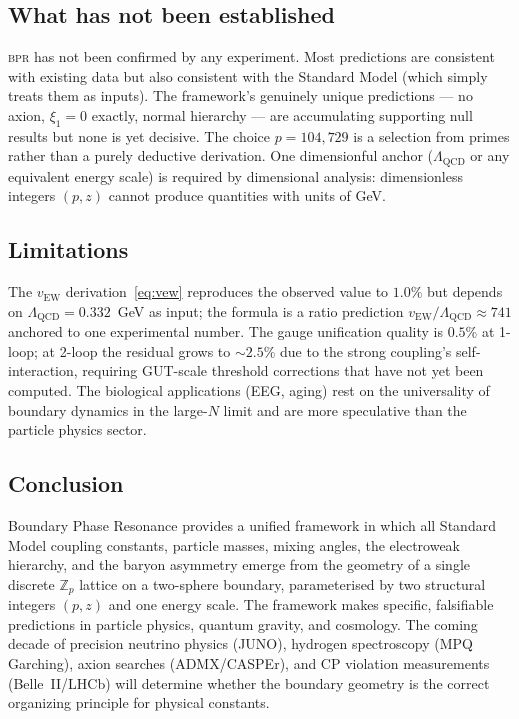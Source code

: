 \documentclass[aps,prd,twocolumn,superscriptaddress,longbibliography,nofootinbib]{revtex4-2}
\newcommand{\Zp}{\mathbb{Z}_p}
\newcommand{\vEW}{v_{\mathrm{EW}}}
\newcommand{\bpr}{\textsc{bpr}}
\begin{document}
\subsection{What has not been established}

\bpr{} has not been confirmed by any experiment.  Most predictions are
consistent with existing data but also consistent with the Standard Model
(which simply treats them as inputs).  The framework's genuinely unique
predictions --- no axion, $\xi_1 = 0$ exactly, normal hierarchy --- are
accumulating supporting null results but none is yet decisive.  The choice
$p = 104{,}729$ is a selection from primes rather than a purely deductive
derivation.  One dimensionful anchor ($\Lambda_{\mathrm{QCD}}$ or any
equivalent energy scale) is required by dimensional analysis: dimensionless
integers $(p, z)$ cannot produce quantities with units of GeV.

\subsection{Limitations}

The $\vEW$ derivation~\eqref{eq:vew} reproduces the observed value to $1.0\%$
but depends on $\Lambda_{\mathrm{QCD}} = 0.332$~GeV as input; the formula is
a ratio prediction $\vEW/\Lambda_{\mathrm{QCD}} \approx 741$ anchored to one
experimental number.  The gauge unification quality is $0.5\%$ at 1-loop;
at 2-loop the residual grows to $\sim2.5\%$ due to the strong coupling's
self-interaction, requiring GUT-scale threshold corrections that have not yet
been computed.  The biological applications (EEG, aging) rest on the
universality of boundary dynamics in the large-$N$ limit and are more
speculative than the particle physics sector.

\subsection{Conclusion}

Boundary Phase Resonance provides a unified framework in which all Standard
Model coupling constants, particle masses, mixing angles, the electroweak
hierarchy, and the baryon asymmetry emerge from the geometry of a single
discrete $\Zp$ lattice on a two-sphere boundary, parameterised by two
structural integers $(p, z)$ and one energy scale.  The framework makes
specific, falsifiable predictions in particle physics, quantum gravity,
and cosmology.  The coming decade of precision neutrino physics (JUNO),
hydrogen spectroscopy (MPQ Garching), axion searches (ADMX/CASPEr), and
CP violation measurements (Belle~II/LHCb) will determine whether the
boundary geometry is the correct organizing principle for physical constants.
\end{document}
